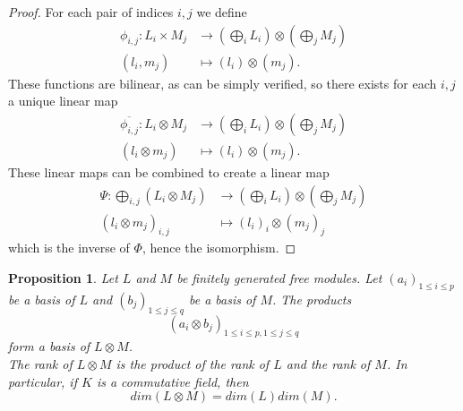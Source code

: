 \documentclass{report}
\newtheorem{prop}{Proposition}
\theoremstyle{definition}
\theoremstyle{remark}
\begin{document}
\begin{proof}
                For each pair of indices $i,j$ we define
                \begin{equation*}
                        \begin{split}
                        \phi_{i,j} : L_i \times M_j & \to (\bigoplus_i L_i) \otimes (\bigoplus_j M_j) \\
                        (l_i ,m_j) & \mapsto (l_i) \otimes (m_j).
                        \end{split}
                \end{equation*}
                These functions are bilinear, as can be simply verified, so there exists for each $i,j$ a unique linear map
                \begin{equation*}
                        \begin{split}
                                \overline{\phi_{i,j}}: L_i \otimes M_j &\to (\bigoplus_i L_i) \otimes(\bigoplus_j M_j) \\
                                (l_i \otimes m_j) & \mapsto (l_i) \otimes (m_j).
                                \end{split}
                \end{equation*}
                These linear maps can be combined to create a linear map
                \begin{equation*}
                        \begin{split}
                                \Psi : \bigoplus_{i,j} (L_i \otimes M_j) & \to (\bigoplus_i L_i) \otimes (\bigoplus_j M_j) \\
                                (l_i \otimes m_j)_{i,j} & \mapsto (l_i)_i \otimes (m_j)_j 
                        \end{split} 
                \end{equation*}
                which is the inverse of $\Phi$, hence the isomorphism.
        \end{proof}


\bigskip


\begin{prop}
    Let $L$ and $M$ be finitely generated free modules. Let $(a_i)_{1\leq i\leq p}$ be a basis of $L$ and $(b_j)_{1 \leq j \leq q}$ be a basis of $M$. The products $$ (a_i \otimes b_j)_{1\leq i \leq p, 1 \leq j \leq q} $$
    form a basis of $L \otimes M$.\\
    The rank of $L\otimes M$ is the product of the rank of $L$ and the rank of $M$. In particular, if $K$ is a commutative field, then $$ dim(L\otimes M) = dim(L)dim(M). $$
\end{prop}    
    
\end{document}
